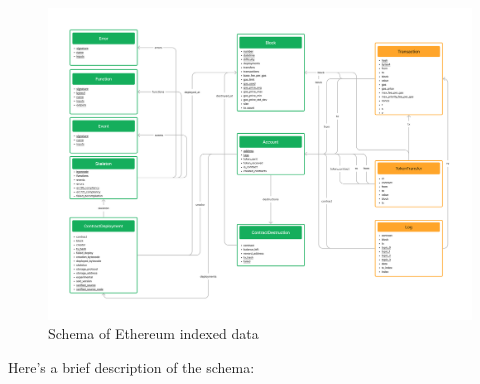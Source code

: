 \begin{figure}[H]
  \centering
  \includegraphics[width=1\textwidth]{Figures/methods/schema.jpg}
  \caption[Schema of Ethereum indexed data]{Schema of Ethereum indexed data}
  \label{fig:schema}
\end{figure}

Here's a brief description of the schema:

